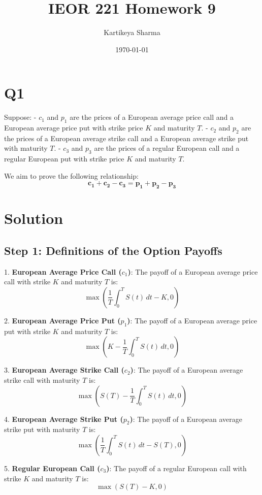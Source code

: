 \documentclass{article}
\title{IEOR 221 Homework 9}
\author{Kartikeya Sharma}
\date{\today}
\begin{document}
\maketitle

\section*{\textbf{Q1}}

Suppose:
- \( c_1 \) and \( p_1 \) are the prices of a European average price call and a European average price put with strike price \( K \) and maturity \( T \).
- \( c_2 \) and \( p_2 \) are the prices of a European average strike call and a European average strike put with maturity \( T \).
- \( c_3 \) and \( p_3 \) are the prices of a regular European call and a regular European put with strike price \( K \) and maturity \( T \).

We aim to prove the following relationship:
\[
\boldsymbol{c_1 + c_2 - c_3 = p_1 + p_2 - p_3}
\]

\section{\textbf{Solution}}

\subsection{\textbf{Step 1: Definitions of the Option Payoffs}}

1. \textbf{European Average Price Call (\( c_1 \))}:  
   The payoff of a European average price call with strike \( K \) and maturity \( T \) is:
   \[
   \max\left(\frac{1}{T} \int_0^T S(t) \, dt - K, 0\right)
   \]

2. \textbf{European Average Price Put (\( p_1 \))}:  
   The payoff of a European average price put with strike \( K \) and maturity \( T \) is:
   \[
   \max\left(K - \frac{1}{T} \int_0^T S(t) \, dt, 0\right)
   \]

3. \textbf{European Average Strike Call (\( c_2 \))}:  
   The payoff of a European average strike call with maturity \( T \) is:
   \[
   \max\left(S(T) - \frac{1}{T} \int_0^T S(t) \, dt, 0\right)
   \]

4. \textbf{European Average Strike Put (\( p_2 \))}:  
   The payoff of a European average strike put with maturity \( T \) is:
   \[
   \max\left(\frac{1}{T} \int_0^T S(t) \, dt - S(T), 0\right)
   \]

5. \textbf{Regular European Call (\( c_3 \))}:  
   The payoff of a regular European call with strike \( K \) and maturity \( T \) is:
   \[
   \max(S(T) - K, 0)
   \]
\end{document}
